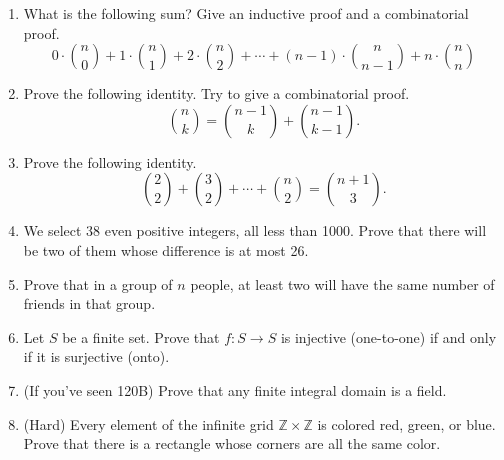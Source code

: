 \documentclass[11pt,letterpaper]{report}
\newcommand{\integers}{\mathbb{Z}}
\begin{document}
\begin{enumerate}
	\vfill

	\item What is the following sum? Give an inductive proof and a combinatorial proof.
	\[
	0\cdot \binom{n}{0} + 1\cdot \binom{n}{1} + 2\cdot \binom{n}{2} + \cdots + (n-1)\cdot\binom{n}{n-1} + n\cdot \binom{n}{n}
	\]
	\vfill\pagebreak

	\item Prove the following identity. Try to give a combinatorial proof.
	\[
	\binom{n}{k} = \binom{n-1}{k} + \binom{n-1}{k-1}.
	\]

	\vfill

	\item Prove the following identity.
	\[
	\binom{2}{2} + \binom{3}{2} + \cdots + \binom{n}{2} = \binom{n+1}{3}.
	\]

	\vfill

	\item We select 38 even positive integers, all less than 1000. Prove that there will be two of them whose difference is at most 26.

	\vfill

	\item Prove that in a group of $n$ people, at least two will have the same number of friends in that group.

	\vfill

	\item Let $S$ be a finite set. Prove that $f: S\to S$ is injective (one-to-one) if and only if it is surjective (onto).\\

	\vfill

	\item (If you've seen 120B) Prove that any finite integral domain is a field.

	\vfill

	\item (Hard) Every element of the infinite grid $\integers\times \integers$ is colored red, green, or blue. Prove that there is a rectangle whose corners are all the same color.
	\vfill

\end{enumerate}
\end{document}
